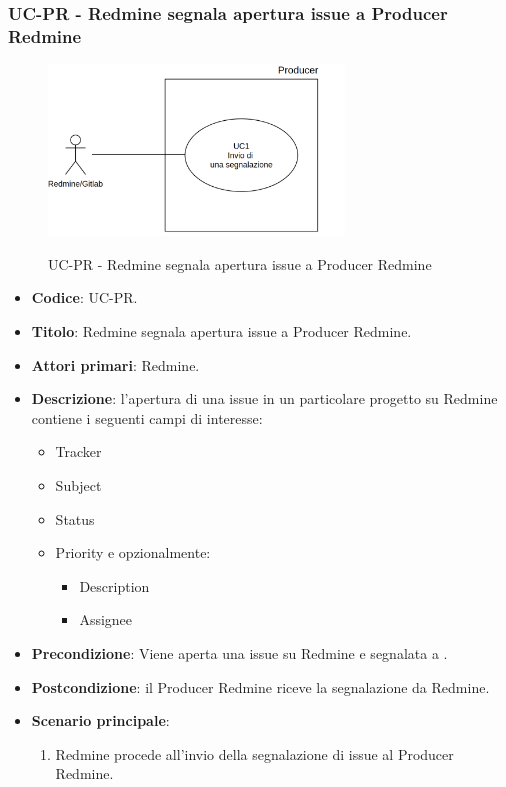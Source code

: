 \subsubsection{UC\theuccount-PR - Redmine segnala apertura issue a Producer Redmine}
    \begin{figure}[H]
		\centering
		\includegraphics[width=0.7\textwidth]{img/UC1.png}\\
		\caption{UC\theuccount-PR - Redmine segnala apertura issue a Producer
			Redmine}
	\end{figure}
	\begin{itemize}
		\item \textbf{Codice}: UC\theuccount-PR.
		\item \textbf{Titolo}: Redmine segnala apertura issue a Producer Redmine.
		\item \textbf{Attori primari}: Redmine.
		\item \textbf{Descrizione}: l'apertura di una issue in un particolare progetto su Redmine
		 contiene i seguenti campi di interesse:
		 \begin{itemize}
		 	\item Tracker
		 	\item Subject
		 	\item Status
		 	\item Priority e opzionalmente:
		 	\begin{itemize}
		 		\item Description
		 		\item Assignee
		 	\end{itemize}
		 \end{itemize}
		\item \textbf{Precondizione}: Viene aperta una issue su Redmine e
		segnalata a \progetto.
		\item \textbf{Postcondizione}: il Producer Redmine riceve la segnalazione da Redmine.
		\item \textbf{Scenario principale}: 
		\begin{enumerate}
			\item Redmine procede all'invio della segnalazione di issue al Producer Redmine.
		\end{enumerate}
		
	\end{itemize}
